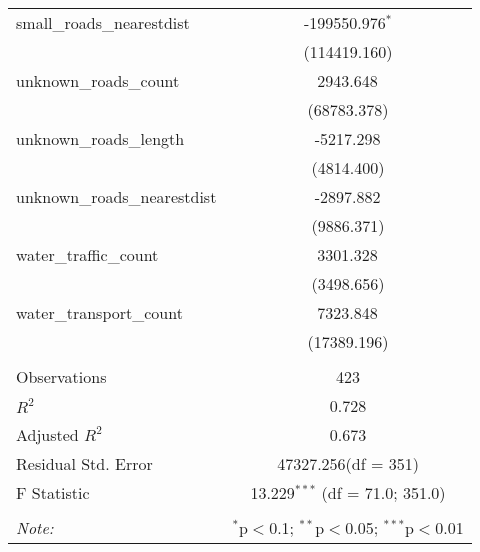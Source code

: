 \begin{table}[!htbp]
\begin{tabular}{@{\extracolsep{5pt}}lc}
 small_roads_nearestdist & -199550.976$^{*}$ \\
  & (114419.160) \\
 unknown_roads_count & 2943.648$^{}$ \\
  & (68783.378) \\
 unknown_roads_length & -5217.298$^{}$ \\
  & (4814.400) \\
 unknown_roads_nearestdist & -2897.882$^{}$ \\
  & (9886.371) \\
 water_traffic_count & 3301.328$^{}$ \\
  & (3498.656) \\
 water_transport_count & 7323.848$^{}$ \\
  & (17389.196) \\
\hline \\[-1.8ex]
 Observations & 423 \\
 $R^2$ & 0.728 \\
 Adjusted $R^2$ & 0.673 \\
 Residual Std. Error & 47327.256(df = 351)  \\
 F Statistic & 13.229$^{***}$ (df = 71.0; 351.0) \\
\hline
\hline \\[-1.8ex]
\textit{Note:} & \multicolumn{1}{r}{$^{*}$p$<$0.1; $^{**}$p$<$0.05; $^{***}$p$<$0.01} \\
\end{tabular}
\end{table}